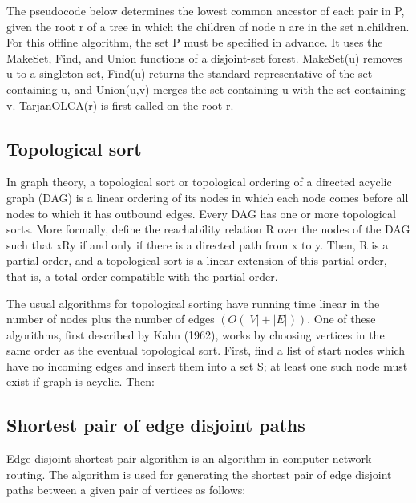 \documentclass[10pt,letterpaper,twocolumn,twosided]{article}
\newcommand{\codigofuente}[1]{

\dotfill
}
\begin{document}
The pseudocode below determines the lowest common ancestor of each pair in P, given the root r of a tree in which the children of node n are in the set n.children. For this offline algorithm, the set P must be specified in advance. It uses the MakeSet, Find, and Union functions of a disjoint-set forest. MakeSet(u) removes u to a singleton set, Find(u) returns the standard representative of the set containing u, and Union(u,v) merges the set containing u with the set containing v. TarjanOLCA(r) is first called on the root r.

\codigofuente{src/graphs/tarjanOLCA.cpp}

\subsection{Topological sort}

In graph theory, a topological sort or topological ordering of a directed acyclic graph (DAG) is a linear ordering of its nodes in which each node comes before all nodes to which it has outbound edges. Every DAG has one or more topological sorts.
More formally, define the reachability relation R over the nodes of the DAG such that xRy if and only if there is a directed path from x to y. Then, R is a partial order, and a topological sort is a linear extension of this partial order, that is, a total order compatible with the partial order.

The usual algorithms for topological sorting have running time linear in the number of nodes plus the number of edges $(O(|V|+|E|))$.
One of these algorithms, first described by Kahn (1962), works by choosing vertices in the same order as the eventual topological sort. First, find a list of start nodes which have no incoming edges and insert them into a set S; at least one such node must exist if graph is acyclic. Then:

\codigofuente{src/graphs/toposort.cpp}

\subsection{Shortest pair of edge disjoint paths}

Edge disjoint shortest pair algorithm is an algorithm in computer network routing. The algorithm 
is used for generating the shortest pair of edge disjoint paths between a given pair of vertices as follows:\\
\end{document}

